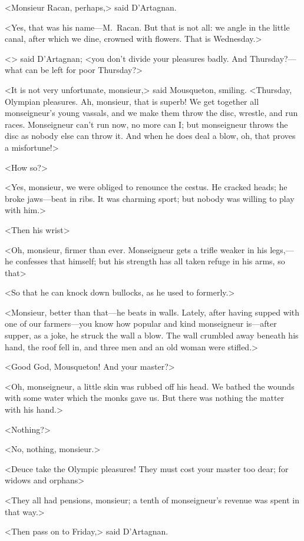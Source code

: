 <Monsieur Racan, perhaps,> said D'Artagnan.

<Yes, that was his name—M.~Racan. But that is not all: we angle in the little canal, after which we dine, crowned with flowers. That is Wednesday.>

<> said D'Artagnan; <you don't divide your pleasures badly. And Thursday?—what can be left for poor Thursday?>

<It is not very unfortunate, monsieur,> said Mousqueton, smiling. <Thursday, Olympian pleasures. Ah, monsieur, that is superb! We get together all monseigneur's young vassals, and we make them throw the disc, wrestle, and run races. Monseigneur can't run now, no more can I; but monseigneur throws the disc as nobody else can throw it. And when he does deal a blow, oh, that proves a misfortune!>

<How so?>

<Yes, monsieur, we were obliged to renounce the cestus. He cracked heads; he broke jaws—beat in ribs. It was charming sport; but nobody was willing to play with him.>

<Then his wrist\longdash>

<Oh, monsieur, firmer than ever. Monseigneur gets a trifle weaker in his legs,—he confesses that himself; but his strength has all taken refuge in his arms, so that\longdash>

<So that he can knock down bullocks, as he used to formerly.>

<Monsieur, better than that—he beats in walls. Lately, after having supped with one of our farmers—you know how popular and kind monseigneur is—after supper, as a joke, he struck the wall a blow. The wall crumbled away beneath his hand, the roof fell in, and three men and an old woman were stifled.>

<Good God, Mousqueton! And your master?>

<Oh, monseigneur, a little skin was rubbed off his head. We bathed the wounds with some water which the monks gave us. But there was nothing the matter with his hand.>

<Nothing?>

<No, nothing, monsieur.>

<Deuce take the Olympic pleasures! They must cost your master too dear; for widows and orphans\longdash>

<They all had pensions, monsieur; a tenth of monseigneur's revenue was spent in that way.>

<Then pass on to Friday,> said D'Artagnan.

